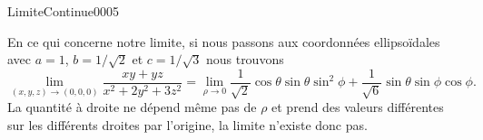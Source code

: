 \begin{corrige}{LimiteContinue0005}
\begin{enumerate}
                                        En ce qui concerne notre limite, si nous passons aux coordonnées ellipsoïdales avec $a=1$, $b=1/\sqrt{2}$ et $c=1/\sqrt{3}$ nous trouvons 
                                        \begin{equation}
                                          \lim_{(x,y,z)\to(0,0,0)} \frac{xy+yz}{x^2+2y^2+3z^2}=\lim_{\rho\to 0} \frac{1}{\sqrt{2}}\cos\theta\sin\theta\sin^2\phi+\frac{1}{\sqrt{6}}\sin\theta\sin\phi\cos\phi.
                                        \end{equation}
                                        La quantité à droite ne dépend même pas de $\rho$ et prend des valeurs différentes sur les différents droites par l'origine, la limite n'existe donc  pas. 
	\end{enumerate}
\end{corrige}
